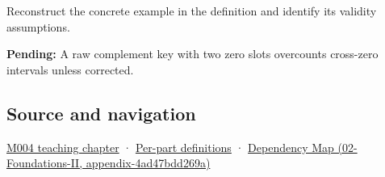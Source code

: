 Reconstruct the concrete example in the definition and identify its validity assumptions.

\textbf{Pending:} A raw complement key with two zero slots overcounts cross-zero intervals unless corrected.

\subsection{Source and navigation}\label{source-and-navigation}

\href{Continuous\%20Notes/Computing\%20Foundations\%20-\%20From\%20Bits\%20to\%20C++\%20and\%20Systems\%20APIs\#A\%20stretching\%20ruler\%20for\%20real-valued\%20quantities}{M004 teaching chapter} · \hyperref[appendix-fd090d982a15]{Per-part definitions} · \href{}{Dependency Map (02-Foundations-II, appendix-4ad47bdd269a)}
